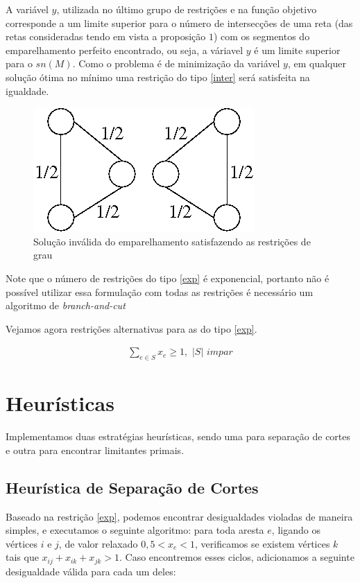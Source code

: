 \documentclass[11pt]{article}
\begin{document}
A variável $y$, utilizada no último grupo de restrições e na função
objetivo corresponde a um limite superior para o número de
intersecções de uma reta (das retas consideradas tendo em vista a
proposição $1$) com os segmentos do emparelhamento perfeito
encontrado, ou seja, a váriavel $y$ é um limite superior para o
$sn(M)$. Como o problema é de minimização da variável $y$, em qualquer
solução ótima no mínimo uma restrição do tipo \eqref{inter} será
satisfeita na igualdade.

\begin{figure}[H]
\centering
\includegraphics[scale=0.50]{ciclos}
\caption{Solução inválida do emparelhamento satisfazendo as restrições
  de grau}
\label{fig:ciclo_impar}
\end{figure}

Note que o número de restrições do tipo \eqref{exp} é exponencial,
portanto não é possível utilizar essa formulação com todas as
restrições é necessário um algoritmo de \emph{branch-and-cut}

Vejamos agora restrições alternativas para as do tipo \eqref{exp}.

\begin{align}
  \sum_{e \in S}{x_e} \ge 1, \hspace{4pt}|S|\hspace{4pt} impar \label{corte}
\end{align}

\section{Heurísticas}

Implementamos duas estratégias heurísticas, sendo uma para separação de
cortes e outra para encontrar limitantes primais. 

\subsection{Heurística de Separação de Cortes}

Baseado na restrição \eqref{exp}, podemos encontrar desigualdades
violadas de maneira simples, e executamos o seguinte algoritmo: para
toda aresta $e$, ligando os vértices $i$ e $j$, de valor relaxado \( 0,5
< x_e < 1 \), verificamos se existem vértices $k$ tais que \( x_{ij} +
x_{ik} + x_{jk} > 1 \). Caso encontremos esses ciclos, adicionamos a
seguinte desigualdade válida para cada um deles: 
\end{document}
